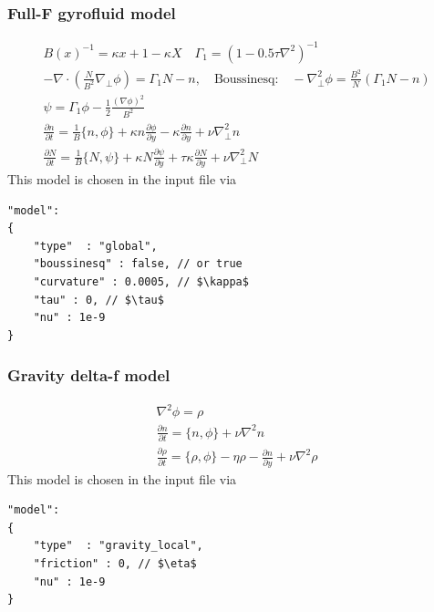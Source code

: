 \subsubsection{Full-F gyrofluid model}
\begin{subequations}
\begin{align}
B(x)^{-1} = \kappa x +1-\kappa X\quad \Gamma_1 = ( 1- 0.5\tau\nabla^2)^{-1}\\
 -\nabla\cdot \left(\frac{N}{B^2} \nabla_\perp \phi\right) = \Gamma_1 N-n, \quad
 \text{Boussinesq:}\quad -\nabla_\perp^2 \phi = \frac{B^2}{N} (\Gamma_1 N -n) \\
\psi = \Gamma_1 \phi - \frac{1}{2} \frac{(\nabla\phi)^2}{B^2}\\
 \frac{\partial n}{\partial t}     =
    \frac{1}{B}\{ n, \phi\}
  + \kappa n\frac{\partial \phi}{\partial y}
  -\kappa \frac{\partial n}{\partial y}
  + \nu \nabla_\perp^2 n  \\
  \frac{\partial N}{\partial t} =
  \frac{1}{B}\{ N, \psi\}
  + \kappa N\frac{\partial \psi}{\partial y}
  + \tau \kappa\frac{\partial N}{\partial y} +\nu\nabla_\perp^2N
\end{align}
\end{subequations}
This model is chosen in the input file via
\begin{verbatim}
"model":
{
    "type"  : "global",
    "boussinesq" : false, // or true
    "curvature" : 0.0005, // $\kappa$
    "tau" : 0, // $\tau$
    "nu" : 1e-9
}
\end{verbatim}

\subsubsection{Gravity delta-f model}
\begin{subequations}
\begin{align}
 \nabla^2 \phi = \rho \\
 \frac{\partial n}{\partial t} = \{ n, \phi\} + \nu \nabla^2 n  \\
  \frac{\partial \rho}{\partial t} = \{ \rho, \phi\} - \eta \rho - \frac{\partial n}{\partial y} + \nu \nabla^2 \rho
\end{align}
\end{subequations}
This model is chosen in the input file via
\begin{verbatim}
"model":
{
    "type"  : "gravity_local",
    "friction" : 0, // $\eta$
    "nu" : 1e-9
}
\end{verbatim}


